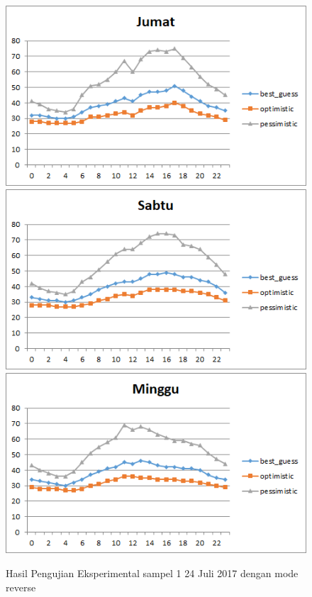\begin{figure}[H]
				\centering		
				\includegraphics[]{Gambar/jumatsampel124072017reverse.png}
				\includegraphics[]{Gambar/sabtusampel124072017reverse.png}
				\includegraphics[]{Gambar/minggusampel124072017reverse.png}
				\caption[Hasil Pengujian Eksperimental]{Hasil Pengujian Eksperimental sampel 1 24 Juli 2017 dengan mode reverse}
				\label{fig:eksperimentalsampel124072017reverse}
\end{figure}

